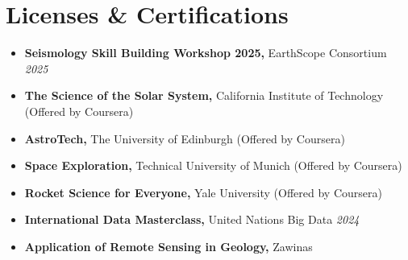 \documentclass[letterpaper,11pt]{article}
\begin{document}
		\section{Licenses \& Certifications}
		\vspace{-0.7em}
		\begin{itemize}[left=0pt, label={}, topsep=7.5pt, partopsep=0pt, itemsep=6pt, parsep=0pt]
			\item \textbf{Seismology Skill Building Workshop 2025,} EarthScope Consortium \hfill \textit{2025}
		\end{itemize}
		\vspace{-1.2em}
		\begin{itemize}[left=0pt, label={}, topsep=7.5pt, partopsep=0pt, itemsep=6pt, parsep=0pt]
			\item \textbf{The Science of the Solar System,} California Institute of Technology (Offered by Coursera)
		\end{itemize}
		\vspace{-1.2em}
		\begin{itemize}[left=0pt, label={}, topsep=7.5pt, partopsep=0pt, itemsep=6pt, parsep=0pt]
			\item \textbf{AstroTech,} The University of Edinburgh (Offered by Coursera)
		\end{itemize}
		\vspace{-1.2em}
		\begin{itemize}[left=0pt, label={}, topsep=7.5pt, partopsep=0pt, itemsep=6pt, parsep=0pt]
			\item \textbf{Space Exploration,} Technical University of Munich (Offered by Coursera)
		\end{itemize}
		\vspace{-1.2em}
		\begin{itemize}[left=0pt, label={}, topsep=7.5pt, partopsep=0pt, itemsep=6pt, parsep=0pt]
			\item \textbf{Rocket Science for Everyone,} Yale University (Offered by Coursera)
		\end{itemize}
		\vspace{-1.2em}
		\begin{itemize}[left=0pt, label={}, topsep=7.5pt, partopsep=0pt, itemsep=6pt, parsep=0pt]
			\item \textbf{International Data Masterclass,} United Nations Big Data  \hfill \textit{2024}
		\end{itemize}
		\vspace{-1.2em} 
		\begin{itemize}[left=0pt, label={}, topsep=7.5pt, partopsep=0pt, itemsep=6pt, parsep=0pt]
			\item \textbf{Application of Remote Sensing in Geology,} Zawinas
		\end{itemize}
\end{document}
